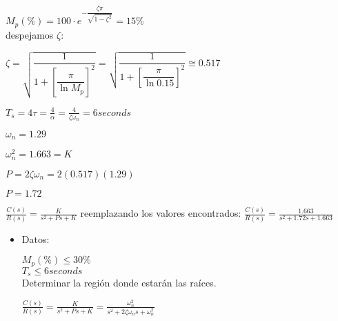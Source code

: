 \documentclass[12pt]{article}
\begin{document}
\begin{enumerate}
\begin{itemize}
    \( \displaystyle M_p(\%) = 100\cdot e^{- \dfrac{\zeta \pi}{\sqrt{1 - \zeta^{2}}}} = 15\% \)\\
    
    despejamos $\zeta$:

    \( \displaystyle \zeta = \sqrt{\dfrac{1}{1+ \left [ \dfrac{\pi}{\ln{M_{p}}} \right ]^{2} }} 
    = \sqrt{\dfrac{1}{1+ \left [ \dfrac{\pi}{\ln{0.15}} \right ]^{2} }} \cong 0.517 \)

    \vspace{1cm}

    \( \displaystyle T_{s}=4\tau=\frac{4}{\alpha}=\frac{4}{\zeta \omega_{n}}=6seconds \)

    $\omega_{n}=1.29$ 

    $\omega_{n}^{2}=1.663=K$

    $P=2\zeta \omega_{n} =2(0.517)(1.29)$

    $P=1.72$

    \(\displaystyle \frac{C(s)}{R(s)} = \frac{K}{s^2 + Ps + K} \) reemplazando
        los valores encontrados: \(\displaystyle \frac{C(s)}{R(s)}=\frac{1.663}{s^2 + 1.72s + 1.663}\)

    \end{itemize}

    \vspace{1cm}


    \begin{itemize}
      \item Datos:

        \( \displaystyle M_{p}(\%) \leq 30\% \)\\
        \( \displaystyle T_{s} \leq 6 seconds \)\\
        Determinar la regi\'on donde estar\'an las ra\'ices.

    \vspace{1cm}

    \( \displaystyle \frac{C(s)}{R(s)} = \frac{K}{s^2 + Ps + K} = \frac{\omega_{n}^{2}}{s^2 + 2\zeta \omega_{n}s + \omega_{n}^{2}} \)


\end{itemize}
\end{enumerate}
\end{document}
